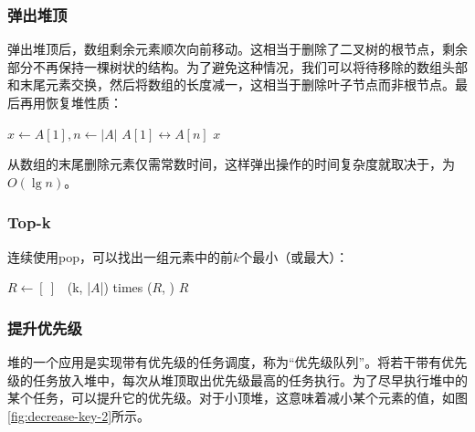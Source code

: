 \documentclass[b5paper]{ctexart}
\begin{document}
\subsubsection{弹出堆顶}
 

弹出堆顶后，数组剩余元素顺次向前移动。这相当于删除了二叉树的根节点，剩余部分不再保持一棵树状的结构。为了避免这种情况，我们可以将待移除的数组头部和末尾元素交换，然后将数组的长度减一，这相当于删除叶子节点而非根节点。最后再用恢复堆性质：

\begin{algorithmic}[1]
  \State $x \gets A [1], n \gets |A|$
  \State {} $A[1] \leftrightarrow A[n]$
  \State {}
    \State {}
  \EndIf
  \State \Return $x$
\EndFunction
\end{algorithmic}

从数组的末尾删除元素仅需常数时间，这样弹出操作的时间复杂度就取决于，为$O(\lg n)$。

\subsubsection{Top-k}

连续使用pop，可以找出一组元素中的前$k$个最小（或最大）：

\begin{algorithmic}[1]
  \State $R \gets [\ ]$
  \State {}
  \Loop \ (k, |$A$|) times 
    \State {}($R$, )
  \EndLoop
  \State \Return $R$
\EndFunction
\end{algorithmic}

\subsubsection{提升优先级}

堆的一个应用是实现带有优先级的任务调度，称为“优先级队列”。将若干带有优先级的任务放入堆中，每次从堆顶取出优先级最高的任务执行。为了尽早执行堆中的某个任务，可以提升它的优先级。对于小顶堆，这意味着减小某个元素的值，如图\ref{fig:decrease-key-2}所示。
\end{document}
